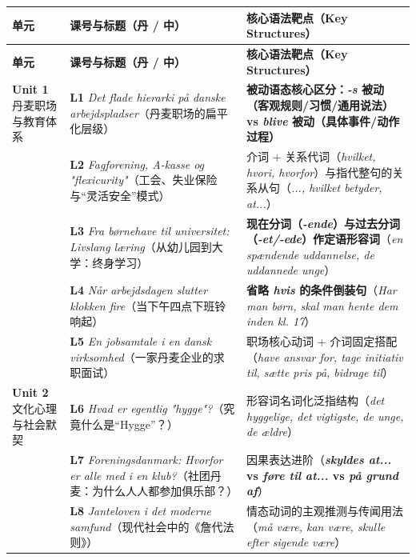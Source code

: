\documentclass[10.5pt, a4paper]{ctexart}
\begin{document}
{\small
\renewcommand{\arraystretch}{1.28}
\begin{longtable}{@{} >{\raggedright\arraybackslash}p{2.65cm} >{\raggedright\arraybackslash}p{5.7cm} >{\raggedright\arraybackslash}p{7.25cm} @{}}
\toprule
\textbf{单元} & \textbf{课号与标题（丹 / 中）} & \textbf{核心语法靶点（Key Structures）} \\
\midrule
\endfirsthead
\toprule
\textbf{单元} & \textbf{课号与标题（丹 / 中）} & \textbf{核心语法靶点（Key Structures）} \\
\midrule
\endhead
\bottomrule
\endfoot
\textbf{Unit 1}\newline 丹麦职场与\newline 教育体系 & \textbf{L1} \textit{Det flade hierarki på danske arbejdspladser}（丹麦职场的扁平化层级） & \textbf{被动语态核心区分：\textit{-s} 被动（客观规则/习惯/通用说法）vs \textit{blive} 被动（具体事件/动作过程）} \\
 & \textbf{L2} \textit{Fagforening, A-kasse og "flexicurity"}（工会、失业保险与“灵活安全”模式） & 介词 + 关系代词（\textit{hvilket, hvori, hvorfor}）与指代整句的关系从句（\textit{..., hvilket betyder, at...}） \\
 & \textbf{L3} \textit{Fra børnehave til universitet: Livslang læring}（从幼儿园到大学：终身学习） & \textbf{现在分词（\textit{-ende}）与过去分词（\textit{-et/-ede}）作定语形容词}（\textit{en spændende uddannelse, de uddannede unge}） \\
 & \textbf{L4} \textit{Når arbejdsdagen slutter klokken fire}（当下午四点下班铃响起） & \textbf{省略 \textit{hvis} 的条件倒装句}（\textit{Har man børn, skal man hente dem inden kl. 17}） \\
 & \textbf{L5} \textit{En jobsamtale i en dansk virksomhed}（一家丹麦企业的求职面试） & 职场核心动词 + 介词固定搭配（\textit{have ansvar for, tage initiativ til, sætte pris på, bidrage til}） \\
\midrule
\textbf{Unit 2}\newline 文化心理与\newline 社会默契 & \textbf{L6} \textit{Hvad er egentlig "hygge"?}（究竟什么是“Hygge”？） & 形容词名词化泛指结构（\textit{det hyggelige, det vigtigste, de unge, de ældre}） \\
 & \textbf{L7} \textit{Foreningsdanmark: Hvorfor er alle med i en klub?}（社团丹麦：为什么人人都参加俱乐部？） & 因果表达进阶（\textbf{\textit{skyldes at...} vs \textit{føre til at...} vs \textit{på grund af}}） \\
 & \textbf{L8} \textit{Janteloven i det moderne samfund}（现代社会中的《詹代法则》） & 情态动词的主观推测与传闻用法（\textit{må være, kan være, skulle efter sigende være}） \\

\end{longtable}}
\end{document}
